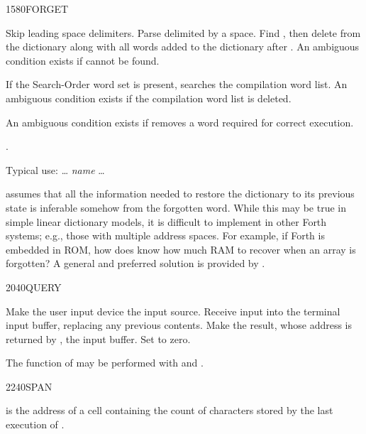 \begin{worddef}{1580}{FORGET}
\item {}

	Skip leading space delimiters. Parse  delimited by a
	space. Find , then delete  from the
	dictionary along with all words added to the dictionary after
	. An ambiguous condition exists if  cannot
	be found.

	If the Search-Order word set is present,  searches
	the compilation word list. An ambiguous condition exists if the
	compilation word list is deleted.

	An ambiguous condition exists if  removes a word
	required for correct execution.

\see {}.

	\begin{rationale} %
		Typical use:
			{\ldots}  \emph{name} {\ldots}

		 assumes that all the information needed to
		restore the dictionary to its previous state is inferable
		somehow from the forgotten word. While this may be true in
		simple linear dictionary models, it is difficult to implement
		in other Forth systems; e.g., those with multiple address
		spaces. For example, if Forth is embedded in ROM, how does
		 know how much RAM to recover when an array
		is forgotten? A general and preferred solution is provided by
		.
	\end{rationale}
\end{worddef}


\begin{worddef}{2040}{QUERY}
\item \stack{}{}

	Make the user input device the input source. Receive input into
	the terminal input buffer, replacing any previous contents. Make
	the result, whose address is returned by , the input
	buffer. Set  to zero.

	\begin{rationale} %
		The function of  may be performed with 
		and .
	\end{rationale}
\end{worddef}


\begin{worddef}{2240}{SPAN}
\item {}

	 is the address of a cell containing the count of
	characters stored by the last execution of .
\end{worddef}


